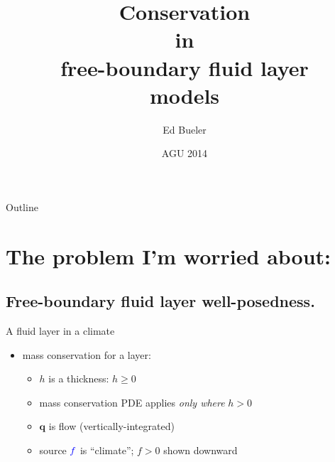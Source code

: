 \documentclass{beamer}
\title[Conservation in free-boundary layers] %
{Conservation \\ in \\ free-boundary fluid layer \\ models}
\author{Ed Bueler}
\institute[UAF] %
{
  Dept of Mathematics and Statistics, and Geophysical Institute\\
  University of Alaska Fairbanks%
}
\date{{\scriptsize AGU 2014}}
\newcommand\bq{\mathbf{q}}
\newcommand{\Div}{\nabla\cdot}
\begin{document}
\graphicspath{{../images/}{../../talks-public/commonfigs/}}

\begin{frame}
  \titlepage
\end{frame}

\begin{frame}{Outline}
  \tableofcontents
\end{frame}





\section{The problem I'm worried about:}

\subsection{Free-boundary fluid layer well-posedness.}

\begin{frame}{A fluid layer in a climate}

\begin{center}
\end{center}

\vspace{-7mm}
  \begin{itemize}
  \item mass conservation for a layer:
     \only<1-4>{$$h_t + \Div\bq = f$$}
     \only<5>{$$h_t + \Div\bq = {\color{blue} f}$$}
    \begin{itemize}
    \vspace{-4mm}
    \item<2->[$\circ$] $h$ is a thickness: $h\ge 0$
    \item<3->[$\circ$] mass conservation PDE applies \emph{only where} $h>0$
    \item<4->[$\circ$] $\bq$ is flow (vertically-integrated)
    \item<5>[$\circ$] source ${\color{blue} f}$ is ``climate''; $f>0$ shown downward
    \end{itemize}
  \end{itemize}
\end{frame}
\end{document}
